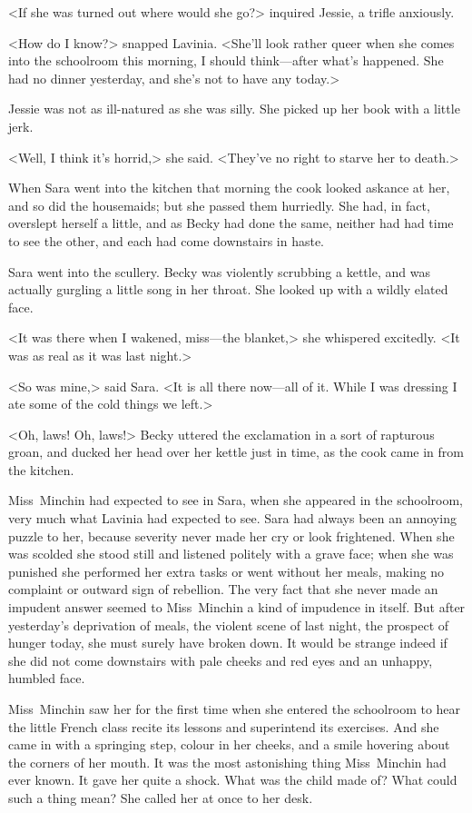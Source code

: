 <If she was turned out where would she go?> inquired Jessie, a trifle anxiously.

<How do I know?> snapped Lavinia. <She'll look rather queer when she comes into the schoolroom this morning, I should think—after what's happened. She had no dinner yesterday, and she's not to have any today.>

Jessie was not as ill-natured as she was silly. She picked up her book with a little jerk.

<Well, I think it's horrid,> she said. <They've no right to starve her to death.>

When Sara went into the kitchen that morning the cook looked askance at her, and so did the housemaids; but she passed them hurriedly. She had, in fact, overslept herself a little, and as Becky had done the same, neither had had time to see the other, and each had come downstairs in haste.

Sara went into the scullery. Becky was violently scrubbing a kettle, and was actually gurgling a little song in her throat. She looked up with a wildly elated face.

<It was there when I wakened, miss—the blanket,> she whispered excitedly. <It was as real as it was last night.>

<So was mine,> said Sara. <It is all there now—all of it. While I was dressing I ate some of the cold things we left.>

<Oh, laws! Oh, laws!> Becky uttered the exclamation in a sort of rapturous groan, and ducked her head over her kettle just in time, as the cook came in from the kitchen.

Miss~Minchin had expected to see in Sara, when she appeared in the schoolroom, very much what Lavinia had expected to see. Sara had always been an annoying puzzle to her, because severity never made her cry or look frightened. When she was scolded she stood still and listened politely with a grave face; when she was punished she performed her extra tasks or went without her meals, making no complaint or outward sign of rebellion. The very fact that she never made an impudent answer seemed to Miss~Minchin a kind of impudence in itself. But after yesterday's deprivation of meals, the violent scene of last night, the prospect of hunger today, she must surely have broken down. It would be strange indeed if she did not come downstairs with pale cheeks and red eyes and an unhappy, humbled face.

Miss~Minchin saw her for the first time when she entered the schoolroom to hear the little French class recite its lessons and superintend its exercises. And she came in with a springing step, colour in her cheeks, and a smile hovering about the corners of her mouth. It was the most astonishing thing Miss~Minchin had ever known. It gave her quite a shock. What was the child made of? What could such a thing mean? She called her at once to her desk.

